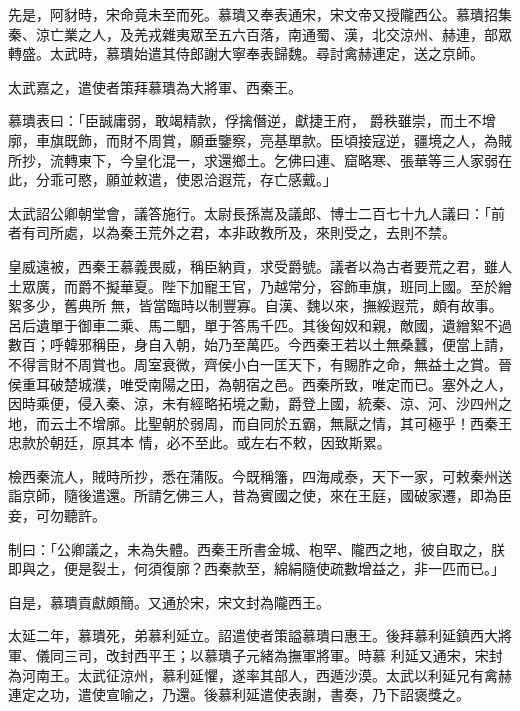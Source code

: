 \begin{pinyinscope}
 先是，阿豺時，宋命竟未至而死。慕璝又奉表通宋，宋文帝又授隴西公。慕璝招集秦、涼亡業之人，及羌戎雜夷眾至五六百落，南通蜀、漢，北交涼州、赫連，部眾轉盛。太武時，慕璝始遣其侍郎謝大寧奉表歸魏。尋討禽赫連定，送之京師。



 太武嘉之，遣使者策拜慕璝為大將軍、西秦王。



 慕璝表曰：「臣誠庸弱，敢竭精款，俘擒僭逆，獻捷王府，
 爵秩雖崇，而土不增廓，車旗既飾，而財不周賞，願垂鑒察，亮基單款。臣頃接寇逆，疆境之人，為賊所抄，流轉東下，今皇化混一，求還鄉土。乞佛曰連、窟略寒、張華等三人家弱在此，分乖可愍，願並敕遣，使恩洽遐荒，存亡感戴。」



 太武詔公卿朝堂會，議答施行。太尉長孫嵩及議郎、博士二百七十九人議曰：「前者有司所處，以為秦王荒外之君，本非政教所及，來則受之，去則不禁。



 皇威遠被，西秦王慕義畏威，稱臣納貢，求受爵號。議者以為古者要荒之君，雖人土眾廣，而爵不擬華夏。陛下加寵王官，乃越常分，容飾車旗，班同上國。至於繒絮多少，舊典所
 無，皆當臨時以制豐寡。自漢、魏以來，撫綏遐荒，頗有故事。呂后遺單于御車二乘、馬二駟，單于答馬千匹。其後匈奴和親，敵國，遺繒絮不過數百；呼韓邪稱臣，身自入朝，始乃至萬匹。今西秦王若以土無桑蠶，便當上請，不得言財不周賞也。周室衰微，齊侯小白一匡天下，有賜胙之命，無益土之賞。晉侯重耳破楚城濮，唯受南陽之田，為朝宿之邑。西秦所致，唯定而已。塞外之人，因時乘便，侵入秦、涼，未有經略拓境之勳，爵登上國，統秦、涼、河、沙四州之地，而云土不增廓。比聖朝於弱周，而自同於五霸，無厭之情，其可極乎！西秦王忠款於朝廷，原其本
 情，必不至此。或左右不敕，因致斯累。



 檢西秦流人，賊時所抄，悉在蒲阪。今既稱籓，四海咸泰，天下一家，可敕秦州送詣京師，隨後遣還。所請乞佛三人，昔為賓國之使，來在王庭，國破家遷，即為臣妾，可勿聽許。



 制曰：「公卿議之，未為失體。西秦王所書金城、枹罕、隴西之地，彼自取之，朕即與之，便是裂土，何須復廓？西秦款至，綿絹隨使疏數增益之，非一匹而已。」



 自是，慕璝貢獻頗簡。又通於宋，宋文封為隴西王。



 太延二年，慕璝死，弟慕利延立。詔遣使者策謚慕璝曰惠王。後拜慕利延鎮西大將軍、儀同三司，改封西平王；以慕璝子元緒為撫軍將軍。時慕
 利延又通宋，宋封為河南王。太武征涼州，慕利延懼，遂率其部人，西遁沙漠。太武以利延兄有禽赫連定之功，遣使宣喻之，乃還。後慕利延遣使表謝，書奏，乃下詔褒獎之。




\end{pinyinscope}
